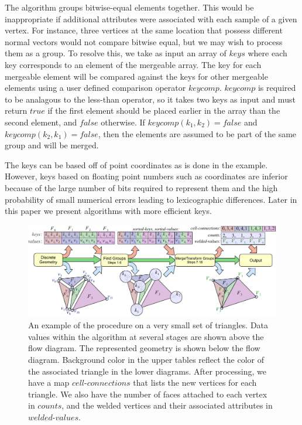 \documentclass[review,journal]{vgtc}         %
\begin{document}
The  algorithm groups bitwise-equal elements together. 
This would be inappropriate if additional attributes were associated with
each sample of a given vertex. For instance, three vertices at the same location that possess different normal vectors
would not compare bitwise equal, but we may wish to process them as a group. To resolve this, we take as input an array of $keys$ where
each key corresponds to an element of the mergeable array. The key for each mergeable element will be compared against the keys for
other mergeable elements using a user defined comparison operator $keycomp$. $keycomp$ is required to be analagous to the less-than operator, so
it takes two keys as input and must return $true$ if the first element should be placed earlier in the array than the second element, and $false$
otherwise. If $keycomp(k_1, k_2) = false$ and $keycomp(k_2, k_1) = false$, then the elements are assumed to be part of the same group and will be merged.

The keys can be based off of point coordinates as is done in the  example. However, keys based on floating point numbers such as coordinates are inferior because of the large number of bits required to represent them and the high probability of small numerical errors leading to lexicographic differences. Later in this paper we present algorithms with more efficient keys.

\begin{figure}[!tb]
\includegraphics[width=\textwidth]{KeyWeld.pdf}
\caption{An example of the  procedure on a very small set of triangles. Data values within the algorithm at several stages are shown above the flow diagram. The represented geometry is shown below the flow diagram. Background color in the upper tables reflect the color of the associated triangle in the lower diagrams. After processing, we have a map $cell\mbox{-}connections$ that lists the new vertices for each triangle. We also have the
number of faces attached to each vertex in $counts$, and the welded vertices and their associated attributes in $welded\mbox{-}values.$}
\label{fig:KeyWeld}
\end{figure}
\end{document}
